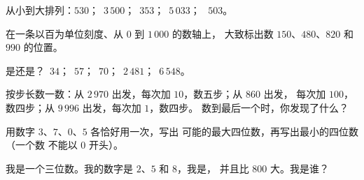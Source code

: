 \begin{exercise}[$\star$]\label{exo:g3:numbers:6}
从小到大排列：$530$；\ $3\,500$；\ $353$；\ $5\,033$；
\ $503$。
\end{exercise}

\begin{exercise}[$\star$]\label{exo:g3:numbers:7}
在一条以百为单位刻度、从 $0$ 到 $1\,000$ 的数轴上，
大致标出数 $150$、$480$、$820$ 和 $990$ 的位置。
\end{exercise}

\begin{exercise}[$\star$]\label{exo:g3:numbers:8}
是还是？\ $34$；\ $57$；\ $70$；\ $2\,481$；\ $6\,548$。
\end{exercise}

\begin{exercise}[$\star$]\label{exo:g3:numbers:9}
按步长数一数：从 $2\,970$ 出发，每次加 $10$，数五步；从 $860$ 出发，
每次加 $100$，数四步；从 $9\,996$ 出发，每次加 $1$，数四步。
数到最后一个时，你发现了什么？
\end{exercise}

\begin{exercise}[$\star\star$]\label{exo:g3:numbers:10}
用数字 $3$、$7$、$0$、$5$ 各恰好用一次，写出
可能的最大四位数，再写出最小的四位数（一个数
不能以 $0$ 开头）。
\end{exercise}

\begin{exercise}[$\star\star$]\label{exo:g3:numbers:11}
我是一个三位数。我的数字是 $2$、$5$ 和 $8$，我是，
并且比 $800$ 大。我是谁？
\end{exercise}
